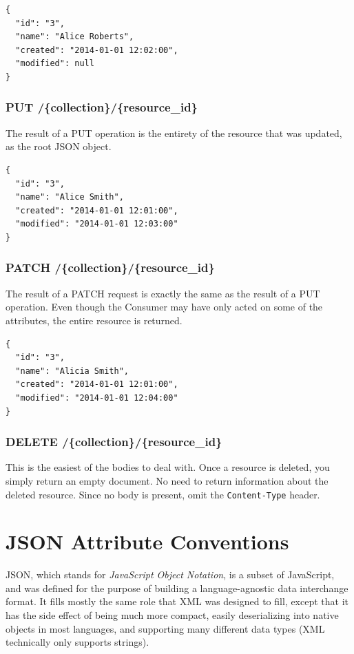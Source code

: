 \documentclass{book}
\begin{document}
\begin{verbatim}
{
  "id": "3",
  "name": "Alice Roberts",
  "created": "2014-01-01 12:02:00",
  "modified": null
}
\end{verbatim}

\subsubsection{PUT /\{collection\}/\{resource\_id\}}

The result of a PUT operation is the entirety of the resource that was updated, as the root JSON object.

\begin{verbatim}
{
  "id": "3",
  "name": "Alice Smith",
  "created": "2014-01-01 12:01:00",
  "modified": "2014-01-01 12:03:00"
}
\end{verbatim}

\subsubsection{PATCH /\{collection\}/\{resource\_id\}}

The result of a PATCH request is exactly the same as the result of a PUT operation. Even though the Consumer may have only acted on some of the attributes, the entire resource is returned.

\begin{verbatim}
{
  "id": "3",
  "name": "Alicia Smith",
  "created": "2014-01-01 12:01:00",
  "modified": "2014-01-01 12:04:00"
}
\end{verbatim}

\subsubsection{DELETE /\{collection\}/\{resource\_id\}}

This is the easiest of the bodies to deal with. Once a resource is deleted, you simply return an empty document. No need to return information about the deleted resource. Since no body is present, omit the \texttt{Content-Type} header.


\section{JSON Attribute Conventions}

JSON, which stands for \emph{JavaScript Object Notation}, is a subset of JavaScript, and was defined for the purpose of building a language-agnostic data interchange format. It fills mostly the same role that XML was designed to fill, except that it has the side effect of being much more compact, easily deserializing into native objects in most languages, and supporting many different data types (XML technically only supports strings).
\end{document}
